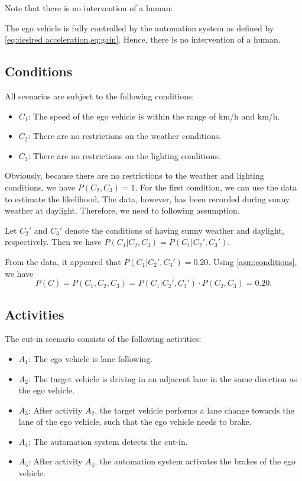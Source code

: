 Note that there is no intervention of a human:
\begin{assumption}
	The ego vehicle is fully controlled by the automation system as defined by \cref{eq:desired acceleration,eq:gain}. Hence, there is no intervention of a human.
\end{assumption}



\subsection{Conditions}
\label{sec:example conditions}

All scenarios are subject to the following conditions:
\begin{itemize}
	\item $C_1$: The speed of the ego vehicle is within the range of \unit[60]{km/h} and \unit[130]{km/h}.
	\item $C_2$: There are no restrictions on the weather conditions.
	\item $C_3$: There are no restrictions on the lighting conditions.
\end{itemize}

Obviously, because there are no restrictions to the weather and lighting conditions, we have $P(C_2,C_3)=1$. For the first condition, we can use the data to estimate the likelihood. The data, however, has been recorded during sunny weather at daylight. Therefore, we need to following assumption.

\begin{assumption} \label{asm:conditions}
	Let $C_2'$ and $C_3'$ denote the conditions of having sunny weather and daylight, respectively. Then we have $P(C_1|C_2,C_3)=P(C_1|C_2',C_3')$.
\end{assumption}

From the data, it appeared that $P(C_1|C_2',C_3')=0.20$. Using \cref{asm:conditions}, we have
\begin{dmath}
	P(C) = P(C_1,C_2,C_3)=P(C_1|C_2',C_3')\cdot P(C_2,C_3)=0.20.
\end{dmath}



\subsection{Activities}
\label{sec:example activities}

The cut-in scenario consists of the following activities:
\begin{itemize}
	\item $A_1$: The ego vehicle is lane following.
	\item $A_2$: The target vehicle is driving in an adjacent lane in the same direction as the ego vehicle.
	\item $A_3$: After activity $A_2$, the target vehicle performs a lane change towards the lane of the ego vehicle, such that the ego vehicle needs to brake.
	\item $A_4$: The automation system detects the cut-in.
	\item $A_5$: After activity $A_4$, the automation system activates the brakes of the ego vehicle.
\end{itemize}

